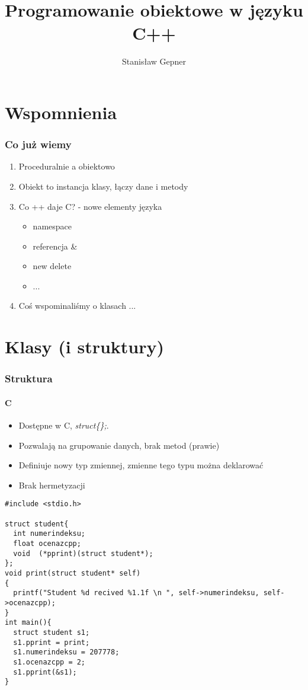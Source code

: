 \documentclass[10pt]{beamer}
\title{Programowanie obiektowe w języku C++}
\author[shortname]{Stanis{\l}aw Gepner}
\institute[shortinst]{sgepner@meil.pw.edu.pl}
\date{}
\begin{document}
\frame{
    \titlepage
}

\section{Wspomnienia}

\begin{frame}
  \frametitle{Co już wiemy}
  
  \centering
  \begin{enumerate}
    \item Proceduralnie a obiektowo
    \item Obiekt to instancja klasy, łączy dane i metody
    \item Co ++ daje C? - nowe elementy języka
    \begin{itemize}
      \item namespace
      \item referencja \&
      \item new delete
      \item ...
    \end{itemize}
    \item Coś wspominaliśmy o klasach ...
  \end{enumerate}
\end{frame}

\section{Klasy (i struktury)}

\begin{frame}[fragile]
  \frametitle{Struktura}
  \framesubtitle{C}
  \centering
  \begin{itemize}
    \item Dostępne w C, \textit{struct\{\};}.
    \item Pozwalają na grupowanie danych, brak metod (prawie)
    \item Definiuje nowy typ zmiennej, zmienne tego typu można deklarować
    \item Brak hermetyzacji
  \end{itemize}
  
  \begin{lstlisting}
#include <stdio.h>

struct student{
  int numerindeksu;
  float ocenazcpp;
  void  (*pprint)(struct student*);
};
void print(struct student* self)
{
  printf("Student %d recived %1.1f \n ", self->numerindeksu, self->ocenazcpp);
}
int main(){
  struct student s1;
  s1.pprint = print;
  s1.numerindeksu = 207778;
  s1.ocenazcpp = 2;
  s1.pprint(&s1);
}
\end{lstlisting}
\end{frame}
\end{document}
